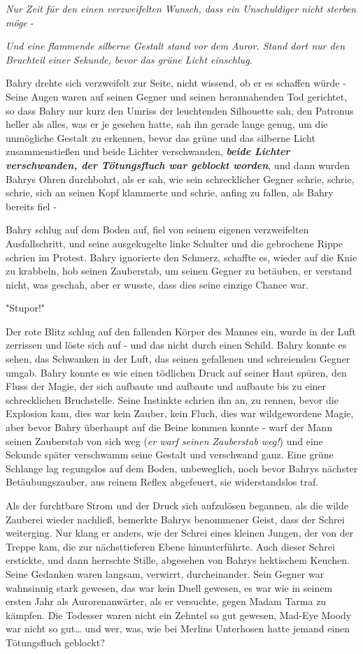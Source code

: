 {\emph{Nur Zeit für den einen verzweifelten Wunsch, dass ein Unschuldiger nicht sterben möge} -

\emph{Und eine flammende silberne Gestalt stand vor dem Auror. Stand dort nur den Bruchteil einer Sekunde, bevor das grüne Licht einschlug.}

Bahry drehte sich verzweifelt zur Seite, nicht wissend, ob er es schaffen würde - Seine Augen waren auf seinen Gegner und seinen herannahenden Tod gerichtet, so dass Bahry nur kurz den Umriss der leuchtenden Silhouette sah, den Patronus heller als alles, was er je gesehen hatte, sah ihn gerade lange genug, um die unmögliche Gestalt zu erkennen, bevor das grüne und das silberne Licht zusammenstießen und beide Lichter verschwanden, \textbf{\emph{beide Lichter verschwanden, der Tötungsfluch war geblockt worden}}, und dann wurden Bahrys Ohren durchbohrt, als er sah, wie sein schrecklicher Gegner schrie, schrie, schrie, sich an seinen Kopf klammerte und schrie, anfing zu fallen, als Bahry bereits fiel -

Bahry schlug auf dem Boden auf, fiel von seinem eigenen verzweifelten Ausfallschritt, und seine ausgekugelte linke Schulter und die gebrochene Rippe schrien im Protest. Bahry ignorierte den Schmerz, schaffte es, wieder auf die Knie zu krabbeln, hob seinen Zauberstab, um seinen Gegner zu betäuben, er verstand nicht, was geschah, aber er wusste, dass dies seine einzige Chance war.

"Stupor!"

Der rote Blitz schlug auf den fallenden Körper des Mannes ein, wurde in der Luft zerrissen und löste sich auf - und das nicht durch einen Schild. Bahry konnte es sehen, das Schwanken in der Luft, das seinen gefallenen und schreienden Gegner umgab. Bahry konnte es wie einen tödlichen Druck auf seiner Haut spüren, den Fluss der Magie, der sich aufbaute und aufbaute und aufbaute bis zu einer schrecklichen Bruchstelle. Seine Instinkte schrien ihn an, zu rennen, bevor die Explosion kam, dies war kein Zauber, kein Fluch, dies war wildgewordene Magie, aber bevor Bahry überhaupt auf die Beine kommen konnte - warf der Mann seinen Zauberstab von sich weg (\emph{er warf seinen Zauberstab weg!}) und eine Sekunde später verschwamm seine Gestalt und verschwand ganz. Eine grüne Schlange lag regungslos auf dem Boden, unbeweglich, noch bevor Bahrys nächster Betäubungszauber, aus reinem Reflex abgefeuert, sie widerstandslos traf.

Als der furchtbare Strom und der Druck sich aufzulösen begannen, als die wilde Zauberei wieder nachließ, bemerkte Bahrys benommener Geist, dass der Schrei weiterging. Nur klang er anders, wie der Schrei eines kleinen Jungen, der von der Treppe kam, die zur nächsttieferen Ebene hinunterführte. Auch dieser Schrei erstickte, und dann herrschte Stille, abgesehen von Bahrys hektischem Keuchen. Seine Gedanken waren langsam, verwirrt, durcheinander. Sein Gegner war wahnsinnig stark gewesen, das war kein Duell gewesen, es war wie in seinem ersten Jahr als Aurorenanwärter, als er versuchte, gegen Madam Tarma zu kämpfen. Die Todesser waren nicht ein Zehntel so gut gewesen, Mad-Eye Moody war nicht so gut… und wer, was, wie bei Merlins Unterhosen hatte jemand einen Tötungsfluch geblockt?

}
